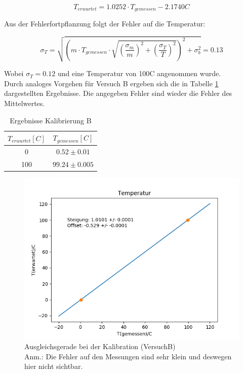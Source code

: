 \documentclass[12pt,a4paper]{article}
\begin{document}
\begin{equation}
T_{erwartet}=1.0252\cdot T_{gemessen}-2.1740C
\end{equation}

Aus der Fehlerfortpflanzung folgt der Fehler auf die Temperatur:

\begin{equation}
\sigma_{T}=\sqrt{\left(m\cdot T_{gemessen}\cdot \sqrt{ (\dfrac{\sigma_m}{m})^{2}+(\dfrac{\sigma_T}{T})^{2}}\right)^{2}+\sigma_{b}^{2}}=0.13
\end{equation}

Wobei $\sigma_T = 0.12$ und eine Temperatur von 100C angenommen wurde.\\
Durch analoges Vorgehen für Versuch B ergeben sich die in Tabelle \ref{tab:KaliB} dargestellten Ergebnisse. Die angegeben Fehler sind wieder die Fehler des Mittelwertes.


\begin{table}[H]
\begin{center}
\begin{tabular}{|c|c|}
\hline 
$T_{erwartet}[C]$ & $T_{gemessen}[C]$ \\ 
\hline 
0 & $0.52 \pm 0.01$ \\ 
\hline 
100 & $99.24\pm 0.005$ \\ 
\hline 
\end{tabular}
\caption[Ergebnisse Kalibrierung B]{Ergebnisse Kalibrierung B}
\label{tab:KaliB}
\end{center}
\end{table}


\begin{figure}[H]
\includegraphics[width=\linewidth]{Bilder/KalibrationB}
\begin{center}
\caption[KalibrationB]{Ausgleichsgerade bei der Kalibration (VersuchB)\\
Anm.: Die Fehler auf den Messungen sind sehr klein und deswegen hier nicht sichtbar.}
\label{fig:GeradeKaliB}
\end{center}
\end{figure}
\end{document}
